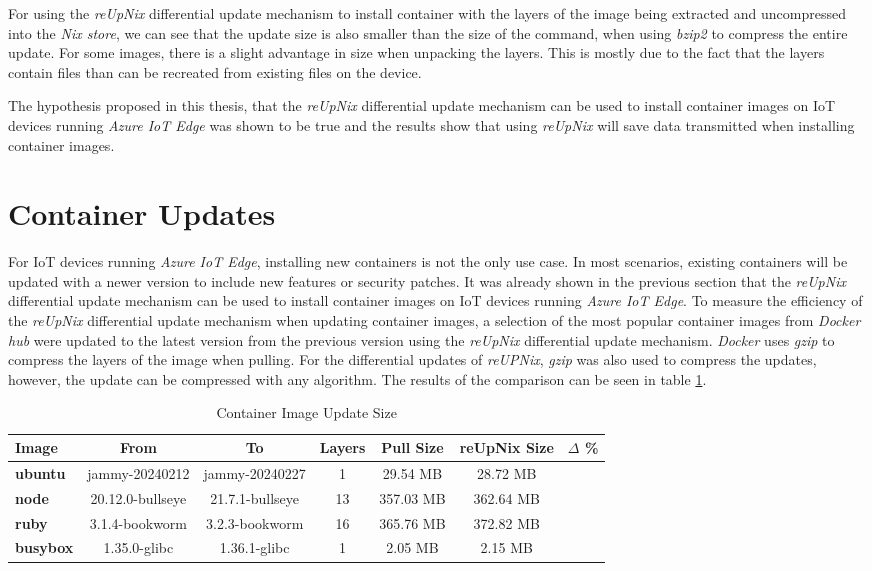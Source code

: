 For using the \textit{reUpNix} differential update mechanism to install container
with the layers of the image being extracted and uncompressed into the
\textit{Nix store}, we can see that the update size is also smaller
than the size of the  command, when using \textit{bzip2} to
compress the entire update. For some images, there is a slight advantage in size
when
unpacking the layers. This is mostly due to the fact that the layers
contain files than can be recreated from existing files on the device.

The hypothesis proposed in this thesis, that the \textit{reUpNix} differential
update mechanism can be used to install container images on \ac{IoT} devices
running \textit{Azure IoT Edge} was shown to be true and the results show that
using \textit{reUpNix} will save data transmitted when installing container images.


\section{Container Updates}
For \ac{IoT} devices running \textit{Azure IoT Edge}, installing new containers
is not the only use case. In most scenarios, existing containers will be updated
with a newer version to include new features or security patches. It was already
shown in the previous section that the \textit{reUpNix} differential update mechanism
can be used to install container images on \ac{IoT} devices running \textit{Azure IoT Edge}.
To measure the efficiency of the \textit{reUpNix} differential update mechanism
when updating container images, a selection of the most popular container images
from \textit{Docker hub} were updated to the latest version from the previous version
using the \textit{reUpNix} differential update mechanism. \textit{Docker} uses
\textit{gzip} to compress the layers of the image when pulling. For the differential
updates of \textit{reUPNix}, \textit{gzip} was also used to compress the updates,
however, the update can be compressed with any algorithm. The results of the
comparison can be seen in table \ref{tab:container-update-size}.

\begin{table}[H]
	\centering
  \footnotesize
	\begin{tabular}{l|c|c|c|c|c|c}
	\toprule
	 Image & From& To & Layers & Pull Size & reUpNix Size &$\Delta$ \% \\
	\midrule
    \textbf{ubuntu} & jammy-20240212 & jammy-20240227 & 1 & 29.54 MB &28.72 MB & \color{ba-green}{- 2.77 \%} \\
    \textbf{node} & 20.12.0-bullseye & 21.7.1-bullseye & 13 & 357.03 MB & 362.64 MB & \color{ba-red}{+ 1.57 \%} \\
    \textbf{ruby} & 3.1.4-bookworm & 3.2.3-bookworm & 16 & 365.76 MB & 372.82 MB & \color{ba-red}{+ 1.93 \%} \\
    \textbf{busybox} & 1.35.0-glibc & 1.36.1-glibc & 1 & 2.05 MB & 2.15 MB & \color{ba-red}{+ 4.87 \%} \\
	\bottomrule
	\end{tabular}
	\caption{Container Image Update Size}
	\label{tab:container-update-size}
\end{table}

